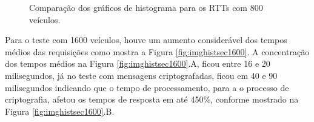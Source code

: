 \documentclass[
	12pt,				%
	oneside,			%
	a4paper,			%
	english,			%
	brazil				%
	]{abntex2ppgsi}
\begin{document}
\begin{figure}[h!]
	\caption{Comparação dos gráficos de histograma para os RTTs com 800 veículos.}
	\centering
	\label{fig:imghistsec800}
\end{figure}  

Para o teste com 1600 veículos, houve um aumento considerável dos tempos médios das requisições como mostra a Figura \ref{fig:imghistsec1600}. A concentração dos tempos médios na Figura \ref{fig:imghistsec1600}.A, ficou entre 16 e 20 milisegundos, já no teste com mensagens criptografadas, ficou em 40 e 90 milisegundos indicando que o tempo de processamento, para a o processo de criptografia, afetou os tempos de resposta em até 450\%, conforme mostrado na Figura \ref{fig:imghistsec1600}.B.
\end{document}
